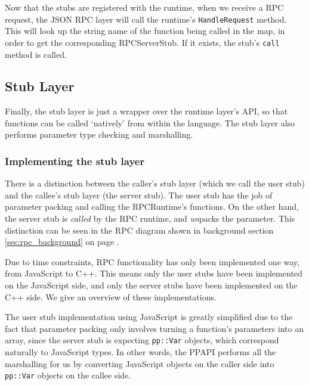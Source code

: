 Now that the stubs are registered with the runtime, when we receive a RPC request, the JSON RPC layer will call the runtime's \lstinline{HandleRequest} method. This will look up the string name of the function being called in the map, in order to get the corresponding RPCServerStub. If it exists, the stub's \lstinline{call} method is called.



\subsection{Stub Layer} %
\label{sub:stub_layer_design}
Finally, the stub layer is just a wrapper over the runtime layer's API, so that functions can be called `natively' from within the language. The stub layer also performs parameter type checking and marshalling.

\subsubsection{Implementing the stub layer} %
\label{ssub:implementing_the_stub_layer}
There is a distinction between the caller's stub layer (which we call the user stub) and the callee's stub layer (the server stub). The user stub has the job of parameter packing and calling the RPCRuntime's functions. On the other hand, the server stub is \emph{called} by the RPC runtime, and \emph{un}packs the parameter. This distinction can be seen in the RPC diagram shown in background section \ref{sec:rpc_background} on page \pageref{sec:rpc_background}.

Due to time constraints, RPC functionality has only been implemented one way, from JavaScript to C++. This means only the user stubs have been implemented on the JavaScript side, and only the server stubs have been implemented on the C++ side. We give an overview of these implementations.

The user stub implementation using JavaScript is greatly simplified due to the fact that parameter packing only involves turning a function's parameters into an array, since the server stub is expecting \lstinline{pp::Var} objects, which correspond naturally to JavaScript types. In other words, the PPAPI performs all the marshalling for us by converting JavaScript objects on the caller side into \lstinline{pp::Var} objects on the callee side.


